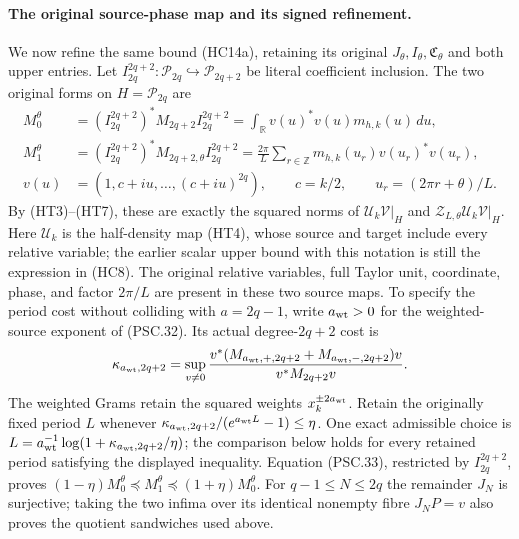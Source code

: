 \paragraph{The original source-phase map and its signed refinement.}
We now refine the same bound (HC14a), retaining its original
$J_\theta,I_\theta,\mathfrak C_\theta$ and both upper entries.
Let $I_{2q}^{2q+2}:\mathcal P_{2q}\hookrightarrow\mathcal P_{2q+2}$
be literal coefficient inclusion. The two original forms on
$H=\mathcal P_{2q}$ are
\[
\begin{aligned}
 M_0^\theta
 &=(I_{2q}^{2q+2})^*M_{2q+2}I_{2q}^{2q+2}
   =\int_{\mathbb{R}}v(u)^*v(u)m_{h,k}(u)\,du,\\
 M_1^\theta
 &=(I_{2q}^{2q+2})^*M_{2q+2,\theta}I_{2q}^{2q+2}
   =\frac{2\pi}{L}\sum_{r\in\mathbb Z}
                 m_{h,k}(u_r)v(u_r)^*v(u_r),\\
 v(u)&=(1,c+iu,\ldots,(c+iu)^{2q}),\qquad
 c=k/2,\qquad u_r=(2\pi r+\theta)/L .
\end{aligned}\tag{HC14b}
\]
By (HT3)--(HT7), these are exactly the squared norms of
$\mathcal U_k\mathcal V|_H$ and
$\mathcal Z_{L,\theta}\mathcal U_k\mathcal V|_H$.
Here $\mathcal U_k$ is the half-density map (HT4), whose source
and target include every relative variable; the earlier scalar
upper bound with this notation is still the expression in (HC8).
The original relative variables, full Taylor unit, coordinate,
phase, and factor $2\pi/L$ are present in these two source maps.
To specify the period cost without colliding with $a=2q-1$,
write $a_{\rm wt}>0$ for the weighted-source exponent of (PSC.32).
Its actual degree-$2q+2$ cost is
\[
 \kappa_{a_{\rm wt},2q+2}
 =\sup_{v\ne0}
 \frac{v^*(M_{a_{\rm wt},+,2q+2}+M_{a_{\rm wt},-,2q+2})v}
      {v^*M_{2q+2}v}.
\]
The weighted Grams retain the squared weights $x_k^{\pm2a_{\rm wt}}$.
Retain the originally fixed period $L$ whenever
$\kappa_{a_{\rm wt},2q+2}/(e^{a_{\rm wt}L}-1)\le\eta$.
One exact admissible choice is
$L=a_{\rm wt}^{-1}\log(1+\kappa_{a_{\rm wt},2q+2}/\eta)$;
the comparison below holds for every retained period satisfying
the displayed inequality.
Equation (PSC.33), restricted by $I_{2q}^{2q+2}$, proves
$(1-\eta)M_0^\theta\preceq M_1^\theta\preceq(1+\eta)M_0^\theta$.
For $q-1\le N\le2q$ the remainder $J_N$ is surjective; taking
the two infima over its identical nonempty fibre $J_NP=v$
also proves the quotient sandwiches used above.

